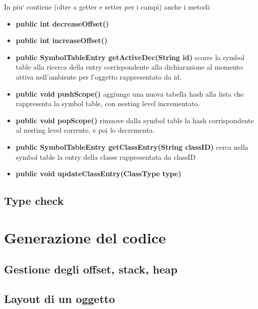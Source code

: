 \documentclass[a4paper]{article}   %
\begin{document}
In piu` contiene (oltre a getter e setter per i campi) anche i metodi:\\
\begin{itemize}
  \item \textbf{public int decreaseOffset()}
  \item \textbf{public int increaseOffset()}
  \item \textbf{public SymbolTableEntry getActiveDec(String id)} scorre la symbol table
  alla ricerca della entry corrispondente alla dichiarazione al momento attiva nell'ambiente per l'oggetto rappresentato da id.
  \item \textbf{public void pushScope()} aggiunge una nuova tabella hash alla lista che rappresenta la symbol table, con nesting level incrementato.
  \item \textbf{public void popScope()} rimuove dalla symbol table la hash corrispondente al nesting level corrente, e poi lo decrementa.
  \item \textbf{public SymbolTableEntry getClassEntry(String classID)} cerca nella symbol table la entry della classe rappresentata da classID
  \item \textbf{public void updateClassEntry(ClassType type)} %



\end{itemize}

\subsection{Type check}

\section{Generazione del codice}

\subsection{Gestione degli offset, stack, heap}
\subsection{Layout di un oggetto}
\end{document}
